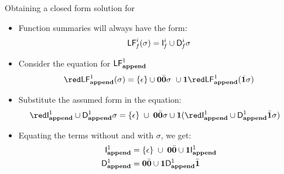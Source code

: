 \documentclass[xcolor=x11names,compress,mathserif]{beamer}
\renewcommand{\(}{\begin{columns}}
\renewcommand{\)}{\end{columns}}
\newcommand{\<}[1]{\begin{column}{#1}}
\renewcommand{\>}{\end{column}}
\begin{document}
\begin{frame}{Obtaining a closed form solution for  \Lfonly}
  \begin{itemize}
  \item<1-> Function summaries will always have the form:
    \begin{align*}
      \mathsf{LF}_{\mathit f}^{i}( {\mathit \sigma}) = \mathsf{I}_{\mathit f}^{i} \cup \mathsf{D}_{\mathit f}^{i}\sigma
    \end{align*}
\item<2-> Consider the  equation for $\mathsf{LF}^{1}_{\mathbf{append}}$
    \begin{align*}
{\red\Lf{\append}{1}{\sigma}} = \{\epsilon\} \cup \acar\bcar\sigma ~
\cup \acdr{\red \Lf{\append}{1}{\bcdr\sigma}}
    \end{align*}
\item<3->Substitute the assumed  form in the equation:
    \begin{align*}
        {\red\Uf{\append}{1}   \cup    \Df{\append}{1}\sigma}
        &= \{\epsilon\}\;  \cup\;
      \acar\bcar\sigma\cup  
      \acdr({\red\Uf{\append}{1} \cup
      \Df{\append}{1}\bcdr\sigma})
    \end{align*}
\item<3-> Equating the terms without and with $\sigma$, we get:  
    \begin{align*}
        \mathsf{I}_{\mathit {\mathbf{append}}}^{1} &= \{\epsilon\}\;  \cup\;
      \mathbf{0}\bar{\mathbf{0}}\cup  
      \mathbf{1}\mathsf{I}_{\mathit {\mathbf{append}}}^{1}\\
  \mathsf{D}_{\mathit {\mathbf{append}}}^{1} &= \mathbf{0}\bar{\mathbf{0}}\cup\mathbf{1} \mathsf{D}_{\mathit {\mathbf{append}}}^{1}\bar{\mathbf{1}}
    \end{align*}
  \end{itemize}
\end{frame}
\end{document}
